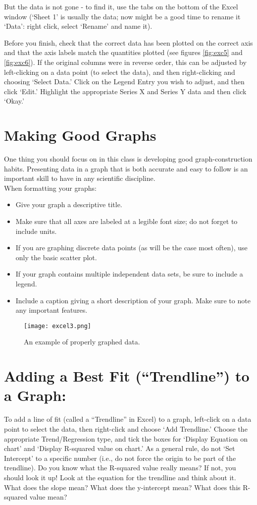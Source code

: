 But the data is not gone - to find it, use the tabs on the bottom of the Excel window (`Sheet 1' is usually the data; now might be a good time to rename it `Data': right click, select `Rename' and name it).
\par 
Before you finish, check that the correct data has been plotted on the correct axis and that the axis labels match the quantities plotted (see figures \ref{fig:exc5} and \ref{fig:exc6}). 
If the original columns were in reverse order, this can be adjusted by left-clicking on a data point (to select the data), and then right-clicking and choosing `Select Data.' 
Click on the Legend Entry you wish to adjust, and then click `Edit.' 
Highlight the appropriate Series X and Series Y data and then click `Okay.'

\section*{Making Good Graphs}
One thing you should focus on in this class is developing good graph-construction habits.
Presenting data in a graph that is both accurate and easy to follow is an important skill to have in any scientific discipline. \\
When formatting your graphs:
\begin{itemize}
\item Give your graph a descriptive title.
\item Make sure that all axes are labeled at a legible font size; do not forget to include units.
\item If you are graphing discrete data points (as will be the case most often), use only the basic scatter plot.
\item If your graph contains multiple independent data sets, be sure to include a legend.
\item Include a caption giving a short description of your graph. Make sure to note any important features.
\end{itemize}
\begin{figure}[h]
\texttt{[image: excel3.png]}
\centering
\caption{An example of properly graphed data.}
\label{fig:exc3}
\end{figure}

\section*{Adding a Best Fit (``Trendline'') to a Graph:}
To add a line of fit (called a ``Trendline'' in Excel) to a graph, left-click on a data point to select the data, then right-click and choose `Add Trendline.' 
Choose the appropriate Trend/Regression type, and tick the boxes for `Display Equation on chart' and `Display R-squared value on chart.' 
As a general rule, do not `Set Intercept' to a specific number (i.e., do not force the origin to be part of the trendline). 
Do you know what the R-squared value really means? 
If not, you should look it up! 
Look at the equation for the trendline and think about it. 
What does the slope mean? 
What does the y-intercept mean? What does this R-squared value mean?

